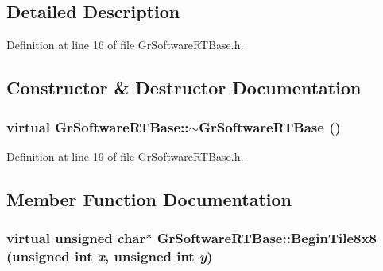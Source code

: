 \subsection{Detailed Description}


Definition at line 16 of file GrSoftwareRTBase.h.

\subsection{Constructor \& Destructor Documentation}
\hypertarget{class_gr_software_r_t_base_6858a3d2fcc6702636a224dfc562453e}{
\subsubsection[{$\sim$GrSoftwareRTBase}]{\setlength{\rightskip}{0pt plus 5cm}virtual GrSoftwareRTBase::$\sim$GrSoftwareRTBase ()}}
\label{class_gr_software_r_t_base_6858a3d2fcc6702636a224dfc562453e}




Definition at line 19 of file GrSoftwareRTBase.h.

\subsection{Member Function Documentation}
\hypertarget{class_gr_software_r_t_base_327778f4649ef0ac403a2eb9fde3031d}{
\subsubsection[{BeginTile8x8}]{\setlength{\rightskip}{0pt plus 5cm}virtual unsigned char$\ast$ GrSoftwareRTBase::BeginTile8x8 (unsigned int {\em x}, \/  unsigned int {\em y})}}
\label{class_gr_software_r_t_base_327778f4649ef0ac403a2eb9fde3031d}




